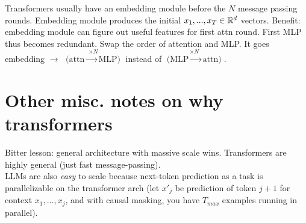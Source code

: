 \documentclass[12pt]{article}
\begin{document}
\begin{outline}
Transformers usually have an embedding module before the $N$ message passing rounds. Embedding module produces the initial $x_1,...,x_T \in \mathbb{R}^d$ vectors.
\1 Benefit: embedding module can figure out useful features for first attn round. First MLP thus becomes redundant. Swap the order of attention and MLP. It goes embedding $\longrightarrow$ $\overset{\times N}{\text{(attn $\longrightarrow$ MLP)}}$ instead of $\overset{\times N}{\text{(MLP $\longrightarrow$ attn)}}$.
\0

\section{Other misc. notes on why transformers}

Bitter lesson: general architecture with massive scale wins. Transformers are highly general (just fast message-passing). \\

LLMs are also \textit{easy} to scale because next-token prediction as a task is parallelizable on the transformer arch (let $x'_j$ be prediction of token $j+1$ for context $x_1,...,x_j$, and with causal masking, you have $T_{max}$ examples running in parallel).

\end{outline}
\end{document}
